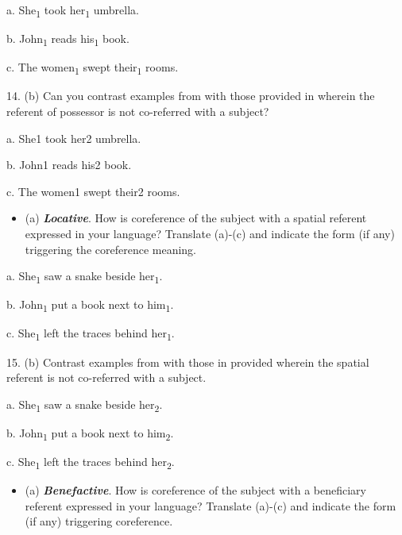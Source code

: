 \documentclass[output=paper]{langsci/langscibook} \label{AppendixA}
\begin{document}
a. She\textsubscript{1} took her\textsubscript{1} umbrella. 



b. John\textsubscript{1} reads his\textsubscript{1} book. 



c. The women\textsubscript{1} swept their\textsubscript{1} rooms. 



14. (b) Can you contrast examples from  with those provided in  wherein the referent of possessor is not co-referred with a subject? 



a. She1 took her2 umbrella. 



b. John1 reads his2 book. 



c. The women1 swept their2 rooms. 


\begin{itemize}
\item
(a) \textbf{\textit{Locative}}. How is coreference of the subject with a spatial referent expressed in your language? Translate (a)-(c) and indicate the form (if any) triggering the coreference meaning. 

\end{itemize}

a. She\textsubscript{1} saw a snake beside her\textsubscript{1}. 



b. John\textsubscript{1} put a book next to him\textsubscript{1}. 



c. She\textsubscript{1} left the traces behind her\textsubscript{1}. 



15. (b) Contrast examples from  with those in provided  wherein the spatial referent is not co-referred with a subject. 



a. She\textsubscript{1} saw a snake beside her\textsubscript{2}. 



b. John\textsubscript{1} put a book next to him\textsubscript{2}. 



c. She\textsubscript{1} left the traces behind her\textsubscript{2}. 


\begin{itemize}
\item
(a) \textbf{\textit{Benefactive}}. How is coreference of the subject with a beneficiary referent expressed in your language? Translate (a)-(c) and indicate the form (if any) triggering coreference. 

\end{itemize}
\end{document}
